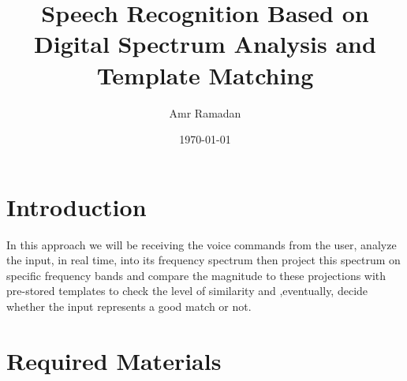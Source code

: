 \documentclass{article}
\title{Speech Recognition Based on Digital Spectrum Analysis and Template Matching} %
\author{Amr Ramadan} %
\date{\today} %
\begin{document}

	\maketitle %
    
	\section{Introduction}

    In this approach we will be receiving the voice commands from the user, analyze the input, in real time, into its frequency spectrum then project this spectrum on specific frequency bands and compare the magnitude to these projections with pre-stored templates to check the level of similarity and ,eventually, decide whether the input represents a good match or not.





    
    \section{Required Materials}
    
\end{document}
